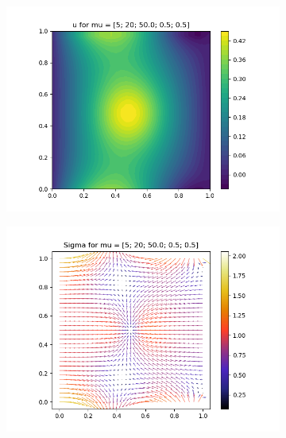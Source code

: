\begin{figure}[!htb]
    \begin{subfigure}{0.35\linewidth}
        \centering
        \includegraphics[width=\linewidth]{figs/mixed_u2_mu2.png}
        \label{subfig:mu2_a}
    \end{subfigure}
    \begin{subfigure}{0.35\linewidth}
        \centering
        \includegraphics[width=\linewidth]{figs/mixed_sigma2_mu2.png}
        \label{subfig:mu2_b}
    \end{subfigure}%
    \begin{subfigure}{0.35\linewidth}
        \centering

\end{subfigure}
\end{figure}
